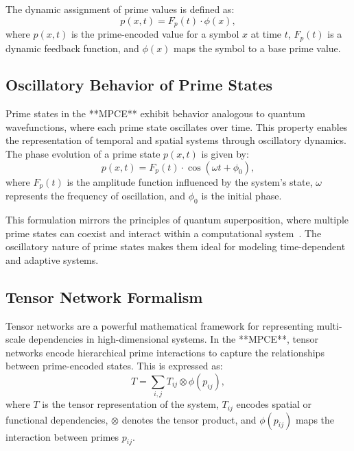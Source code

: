 \documentclass{article}
\theoremstyle{plain}
\begin{document}
The dynamic assignment of prime values is defined as:
\begin{equation}
    p(x, t) = F_p(t) \cdot \phi(x),
\end{equation}
where \( p(x, t) \) is the prime-encoded value for a symbol \( x \) at time \( t \), \( F_p(t) \) is a dynamic feedback function, and \( \phi(x) \) maps the symbol to a base prime value.

\subsection{Oscillatory Behavior of Prime States}

Prime states in the **MPCE** exhibit behavior analogous to quantum wavefunctions, where each prime state oscillates over time. This property enables the representation of temporal and spatial systems through oscillatory dynamics. The phase evolution of a prime state \( p(x, t) \) is given by:
\begin{equation}
    p(x, t) = F_p(t) \cdot \cos(\omega t + \phi_0),
\end{equation}
where \( F_p(t) \) is the amplitude function influenced by the system's state, \( \omega \) represents the frequency of oscillation, and \( \phi_0 \) is the initial phase.

This formulation mirrors the principles of quantum superposition, where multiple prime states can coexist and interact within a computational system~\cite{deutsch1985quantum, feynman2010quantum}. The oscillatory nature of prime states makes them ideal for modeling time-dependent and adaptive systems.

\subsection{Tensor Network Formalism}

Tensor networks are a powerful mathematical framework for representing multi-scale dependencies in high-dimensional systems. In the **MPCE**, tensor networks encode hierarchical prime interactions to capture the relationships between prime-encoded states. This is expressed as:
\begin{equation}
    T = \sum_{i, j} T_{ij} \otimes \phi(p_{ij}),
\end{equation}
where \( T \) is the tensor representation of the system, \( T_{ij} \) encodes spatial or functional dependencies, \( \otimes \) denotes the tensor product, and \( \phi(p_{ij}) \) maps the interaction between primes \( p_{ij} \).
\end{document}
